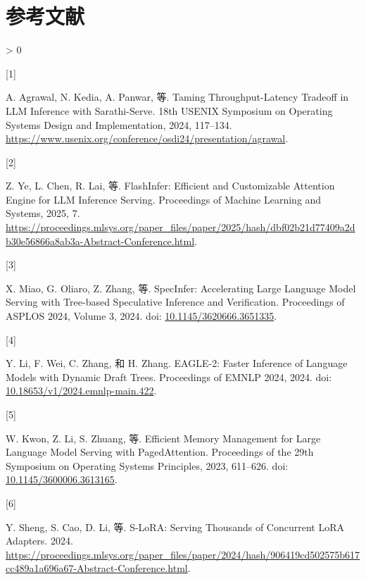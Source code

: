 \documentclass[
  UTF8,
  zihao=5]{ctexart}
\newlength{\cslhangindent}
\newlength{\csllabelwidth}
\newenvironment{CSLReferences}[2] %
 {%
  \setlength{\parindent}{0pt}
  \ifodd #1 \everypar{\setlength{\hangindent}{\cslhangindent}}\ignorespaces\fi
  \ifnum #2 > 0
  \setlength{\parskip}{#2\baselineskip}
  \fi
 }%
 {}
\newcommand{\CSLLeftMargin}[1]{\parbox[t]{\csllabelwidth}{#1}}
\newcommand{\CSLRightInline}[1]{\parbox[t]{\linewidth - \csllabelwidth}{#1}\par}
\begin{document}
\hypertarget{ux53c2ux8003ux6587ux732e}{%
\section*{参考文献}\label{ux53c2ux8003ux6587ux732e}}

\hypertarget{refs}{}
\begin{CSLReferences}{0}{0}
\leavevmode{}%
\CSLLeftMargin{{[}1{]} }%
\CSLRightInline{A. Agrawal, N. Kedia, A. Panwar, 等. Taming
Throughput-Latency Tradeoff in {LLM} Inference with {Sarathi-Serve}.
18th USENIX Symposium on Operating Systems Design and Implementation,
2024, 117--134.
\url{https://www.usenix.org/conference/osdi24/presentation/agrawal}.}

\leavevmode{}%
\CSLLeftMargin{{[}2{]} }%
\CSLRightInline{Z. Ye, L. Chen, R. Lai, 等. {FlashInfer: Efficient and
Customizable Attention Engine for LLM Inference Serving}. Proceedings of
Machine Learning and Systems, 2025, 7.
\url{https://proceedings.mlsys.org/paper_files/paper/2025/hash/dbf02b21d77409a2db30e56866a8ab3a-Abstract-Conference.html}.}

\leavevmode{}%
\CSLLeftMargin{{[}3{]} }%
\CSLRightInline{X. Miao, G. Oliaro, Z. Zhang, 等. SpecInfer:
Accelerating Large Language Model Serving with Tree-based Speculative
Inference and Verification. Proceedings of ASPLOS 2024, Volume 3, 2024.
doi:
\href{https://doi.org/10.1145/3620666.3651335}{10.1145/3620666.3651335}.}

\leavevmode{}%
\CSLLeftMargin{{[}4{]} }%
\CSLRightInline{Y. Li, F. Wei, C. Zhang, 和 H. Zhang. EAGLE-2: Faster
Inference of Language Models with Dynamic Draft Trees. Proceedings of
EMNLP 2024, 2024. doi:
\href{https://doi.org/10.18653/v1/2024.emnlp-main.422}{10.18653/v1/2024.emnlp-main.422}.}

\leavevmode{}%
\CSLLeftMargin{{[}5{]} }%
\CSLRightInline{W. Kwon, Z. Li, S. Zhuang, 等. {Efficient Memory
Management for Large Language Model Serving with PagedAttention}.
Proceedings of the 29th Symposium on Operating Systems Principles, 2023,
611--626. doi:
\href{https://doi.org/10.1145/3600006.3613165}{10.1145/3600006.3613165}.}

\leavevmode{}%
\CSLLeftMargin{{[}6{]} }%
\CSLRightInline{Y. Sheng, S. Cao, D. Li, 等. S-LoRA: Serving Thousands
of Concurrent LoRA Adapters. 2024.
\url{https://proceedings.mlsys.org/paper_files/paper/2024/hash/906419cd502575b617cc489a1a696a67-Abstract-Conference.html}.}


\end{CSLReferences}
\end{document}
